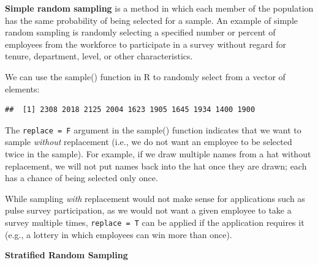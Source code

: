 \documentclass[]{book}
\newenvironment{Shaded}{\begin{snugshade}}{\end{snugshade}}
\newcommand{\CommentTok}[1]{\textcolor[rgb]{0.56,0.35,0.01}{\textit{#1}}}
\newcommand{\DataTypeTok}[1]{\textcolor[rgb]{0.13,0.29,0.53}{#1}}
\newcommand{\DecValTok}[1]{\textcolor[rgb]{0.00,0.00,0.81}{#1}}
\newcommand{\KeywordTok}[1]{\textcolor[rgb]{0.13,0.29,0.53}{\textbf{#1}}}
\newcommand{\NormalTok}[1]{#1}
\newcommand{\OperatorTok}[1]{\textcolor[rgb]{0.81,0.36,0.00}{\textbf{#1}}}
\newcommand{\StringTok}[1]{\textcolor[rgb]{0.31,0.60,0.02}{#1}}
\begin{document}
\textbf{Simple random sampling} is a method in which each member of the population has the same probability of being selected for a sample. An example of simple random sampling is randomly selecting a specified number or percent of employees from the workforce to participate in a survey without regard for tenure, department, level, or other characteristics.

We can use the sample() function in R to randomly select from a vector of elements:

\begin{Shaded}
\end{Shaded}

\begin{verbatim}
##  [1] 2308 2018 2125 2004 1623 1905 1645 1934 1400 1900
\end{verbatim}

The \texttt{replace\ =\ F} argument in the sample() function indicates that we want to sample \emph{without} replacement (i.e., we do not want an employee to be selected twice in the sample). For example, if we draw multiple names from a hat without replacement, we will not put names back into the hat once they are drawn; each has a chance of being selected only once.

While sampling \emph{with} replacement would not make sense for applications such as pulse survey participation, as we would not want a given employee to take a survey multiple times, \texttt{replace\ =\ T} can be applied if the application requires it (e.g., a lottery in which employees can win more than once).

\textbf{Stratified Random Sampling}
\end{document}
